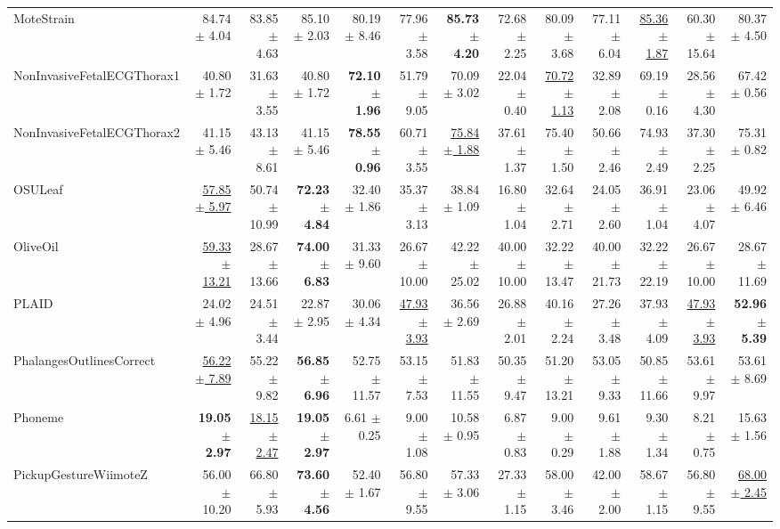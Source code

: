 \begin{landscape}
\begin{longtable}{lrrrrrrrrrrrr}
MoteStrain & 84.74 $\pm$ 4.04 & 83.85 $\pm$ 4.63 & 85.10 $\pm$ 2.03 & 80.19 $\pm$ 8.46 & 77.96 $\pm$ 3.58 & \textbf{85.73 $\pm$ 4.20} & 72.68 $\pm$ 2.25 & 80.09 $\pm$ 3.68 & 77.11 $\pm$ 6.04 & \underline{85.36 $\pm$ 1.87} & 60.30 $\pm$ 15.64 & 80.37 $\pm$ 4.50 \\
NonInvasiveFetalECGThorax1 & 40.80 $\pm$ 1.72 & 31.63 $\pm$ 3.55 & 40.80 $\pm$ 1.72 & \textbf{72.10 $\pm$ 1.96} & 51.79 $\pm$ 9.05 & 70.09 $\pm$ 3.02 & 22.04 $\pm$ 0.40 & \underline{70.72 $\pm$ 1.13} & 32.89 $\pm$ 2.08 & 69.19 $\pm$ 0.16 & 28.56 $\pm$ 4.30 & 67.42 $\pm$ 0.56 \\
NonInvasiveFetalECGThorax2 & 41.15 $\pm$ 5.46 & 43.13 $\pm$ 8.61 & 41.15 $\pm$ 5.46 & \textbf{78.55 $\pm$ 0.96} & 60.71 $\pm$ 3.55 & \underline{75.84 $\pm$ 1.88} & 37.61 $\pm$ 1.37 & 75.40 $\pm$ 1.50 & 50.66 $\pm$ 2.46 & 74.93 $\pm$ 2.49 & 37.30 $\pm$ 2.25 & 75.31 $\pm$ 0.82 \\
OSULeaf & \underline{57.85 $\pm$ 5.97} & 50.74 $\pm$ 10.99 & \textbf{72.23 $\pm$ 4.84} & 32.40 $\pm$ 1.86 & 35.37 $\pm$ 3.13 & 38.84 $\pm$ 1.09 & 16.80 $\pm$ 1.04 & 32.64 $\pm$ 2.71 & 24.05 $\pm$ 2.60 & 36.91 $\pm$ 1.04 & 23.06 $\pm$ 4.07 & 49.92 $\pm$ 6.46 \\
OliveOil & \underline{59.33 $\pm$ 13.21} & 28.67 $\pm$ 13.66 & \textbf{74.00 $\pm$ 6.83} & 31.33 $\pm$ 9.60 & 26.67 $\pm$ 10.00 & 42.22 $\pm$ 25.02 & 40.00 $\pm$ 10.00 & 32.22 $\pm$ 13.47 & 40.00 $\pm$ 21.73 & 32.22 $\pm$ 22.19 & 26.67 $\pm$ 10.00 & 28.67 $\pm$ 11.69 \\
PLAID & 24.02 $\pm$ 4.96 & 24.51 $\pm$ 3.44 & 22.87 $\pm$ 2.95 & 30.06 $\pm$ 4.34 & \underline{47.93 $\pm$ 3.93} & 36.56 $\pm$ 2.69 & 26.88 $\pm$ 2.01 & 40.16 $\pm$ 2.24 & 27.26 $\pm$ 3.48 & 37.93 $\pm$ 4.09 & \underline{47.93 $\pm$ 3.93} & \textbf{52.96 $\pm$ 5.39} \\
PhalangesOutlinesCorrect & \underline{56.22 $\pm$ 7.89} & 55.22 $\pm$ 9.82 & \textbf{56.85 $\pm$ 6.96} & 52.75 $\pm$ 11.57 & 53.15 $\pm$ 7.53 & 51.83 $\pm$ 11.55 & 50.35 $\pm$ 9.47 & 51.20 $\pm$ 13.21 & 53.05 $\pm$ 9.33 & 50.85 $\pm$ 11.66 & 53.61 $\pm$ 9.97 & 53.61 $\pm$ 8.69 \\
Phoneme & \textbf{19.05 $\pm$ 2.97} & \underline{18.15 $\pm$ 2.47} & \textbf{19.05 $\pm$ 2.97} & 6.61 $\pm$ 0.25 & 9.00 $\pm$ 1.08 & 10.58 $\pm$ 0.95 & 6.87 $\pm$ 0.83 & 9.00 $\pm$ 0.29 & 9.61 $\pm$ 1.88 & 9.30 $\pm$ 1.34 & 8.21 $\pm$ 0.75 & 15.63 $\pm$ 1.56 \\
PickupGestureWiimoteZ & 56.00 $\pm$ 10.20 & 66.80 $\pm$ 5.93 & \textbf{73.60 $\pm$ 4.56} & 52.40 $\pm$ 1.67 & 56.80 $\pm$ 9.55 & 57.33 $\pm$ 3.06 & 27.33 $\pm$ 1.15 & 58.00 $\pm$ 3.46 & 42.00 $\pm$ 2.00 & 58.67 $\pm$ 1.15 & 56.80 $\pm$ 9.55 & \underline{68.00 $\pm$ 2.45} \\

\end{longtable}
\end{landscape}
